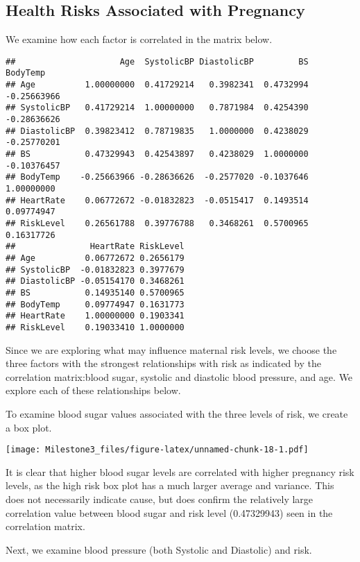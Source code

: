 \documentclass[
]{article}
\begin{document}
\hypertarget{health-risks-associated-with-pregnancy}{%
\subsection{Health Risks Associated with
Pregnancy}\label{health-risks-associated-with-pregnancy}}

We examine how each factor is correlated in the matrix below.

\begin{verbatim}
##                     Age  SystolicBP DiastolicBP         BS    BodyTemp
## Age          1.00000000  0.41729214   0.3982341  0.4732994 -0.25663966
## SystolicBP   0.41729214  1.00000000   0.7871984  0.4254390 -0.28636626
## DiastolicBP  0.39823412  0.78719835   1.0000000  0.4238029 -0.25770201
## BS           0.47329943  0.42543897   0.4238029  1.0000000 -0.10376457
## BodyTemp    -0.25663966 -0.28636626  -0.2577020 -0.1037646  1.00000000
## HeartRate    0.06772672 -0.01832823  -0.0515417  0.1493514  0.09774947
## RiskLevel    0.26561788  0.39776788   0.3468261  0.5700965  0.16317726
##               HeartRate RiskLevel
## Age          0.06772672 0.2656179
## SystolicBP  -0.01832823 0.3977679
## DiastolicBP -0.05154170 0.3468261
## BS           0.14935140 0.5700965
## BodyTemp     0.09774947 0.1631773
## HeartRate    1.00000000 0.1903341
## RiskLevel    0.19033410 1.0000000
\end{verbatim}

Since we are exploring what may influence maternal risk levels, we
choose the three factors with the strongest relationships with risk as
indicated by the correlation matrix:blood sugar, systolic and diastolic
blood pressure, and age. We explore each of these relationships below.

To examine blood sugar values associated with the three levels of risk,
we create a box plot.

\texttt{[image: Milestone3\_files/figure-latex/unnamed-chunk-18-1.pdf]}

\bigskip

It is clear that higher blood sugar levels are correlated with higher
pregnancy risk levels, as the high risk box plot has a much larger
average and variance. This does not necessarily indicate cause, but does
confirm the relatively large correlation value between blood sugar and
risk level (0.47329943) seen in the correlation matrix.

Next, we examine blood pressure (both Systolic and Diastolic) and risk.
\end{document}
